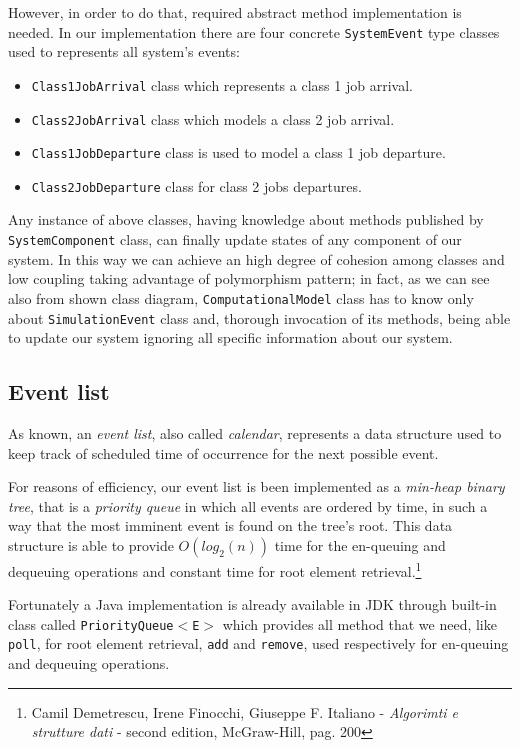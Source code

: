 \documentclass[10pt,a4paper]{article}
\begin{document}
However, in order to do that, required abstract method implementation is needed. In our implementation there are four concrete \texttt{SystemEvent} type classes used to represents all system's events:

\begin{itemize}
\item \texttt{Class1JobArrival} class which represents a class 1 job arrival.
\item \texttt{Class2JobArrival} class which models a class 2 job arrival.
\item \texttt{Class1JobDeparture} class is used to model a class 1 job departure.
\item \texttt{Class2JobDeparture} class for class 2 jobs departures.
\end{itemize}

Any instance of above classes, having knowledge about methods published by \texttt{SystemComponent} class, can finally update states of any component of our system. In this way we can achieve an high degree of cohesion among classes and low coupling taking advantage of polymorphism pattern; in fact, as we can see also from shown class diagram, \texttt{ComputationalModel} class has to know only about \texttt{SimulationEvent} class and, thorough invocation of its methods, being able to update our system ignoring all specific information about our system.

\subsection{Event list}

As known, an \textit{event list}, also called \textit{calendar}, represents a data structure used to keep track of scheduled time of occurrence for the next possible event.

For reasons of efficiency, our event list is been implemented as a \textit{min-heap binary tree}, that is a \textit{priority queue} in which all events are ordered by time, in such a way that the most imminent event is found on the tree's root. This data structure is able to provide $O(log_2(n))$ time for the en-queuing and dequeuing operations and constant time for root element retrieval.\footnote{Camil Demetrescu, Irene Finocchi, Giuseppe F. Italiano - \textit{Algorimti e strutture dati} - second edition, McGraw-Hill, pag. 200} 

Fortunately a Java implementation is already available in JDK through built-in class called \texttt{PriorityQueue$<$E$>$} which provides all method that we need, like \texttt{poll}, for root element retrieval, \texttt{add} and \texttt{remove}, used respectively for en-queuing and dequeuing operations.
\end{document}
